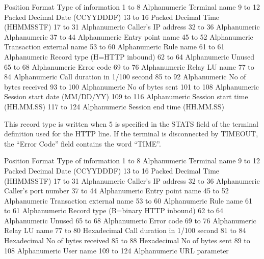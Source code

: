 \documentclass[letterpaper,10pt,english]{sphinxmanual}
\begin{document}
\begin{sphinxVerbatim}[commandchars=\\\{\}]
Position        Format          Type of information
1 to 8          Alphanumeric    Terminal name
9 to 12         Packed Decimal  Date (CCYYDDDF)
13 to 16        Packed Decimal  Time (HHMMSSTF)
17 to 31        Alphanumeric    Caller’s IP address
32 to 36        Alphanumeric    Alphanumeric
37 to 44        Alphanumeric    Entry point name
45 to 52        Alphanumeric    Transaction external name
53 to 60        Alphanumeric    Rule name
61 to 61        Alphanumeric    Record type (H=HTTP inbound)
62 to 64        Alphanumeric    Unused
65 to 68        Alphanumeric    Error code
69 to 76        Alphanumeric    Relay LU name
77 to 84        Alphanumeric    Call duration in 1/100 second
85 to 92        Alphanumeric    No of bytes received
93 to 100       Alphanumeric    No of bytes sent
101 to 108      Alphanumeric    Session start date (MM/DD/YY)
109 to 116      Alphanumeric    Session start time (HH.MM.SS)
117 to 124      Alphanumeric    Session end time (HH.MM.SS)
\end{sphinxVerbatim}


This record type is written when 5 is specified in the STATS field of the terminal definition used for the HTTP line. If the terminal is disconnected by TIMEOUT, the “Error Code” field contains the word     “TIME”.

\begin{sphinxVerbatim}[commandchars=\\\{\}]
Position        Format          Type of information
1 to 8          Alphanumeric    Terminal name
9 to 12         Packed Decimal  Date (CCYYDDDF)
13 to 16        Packed Decimal  Time (HHMMSSTF)
17 to 31        Alphanumeric    Caller’s IP address
32 to 36        Alphanumeric    Caller’s port number
37 to 44        Alphanumeric    Entry point name
45 to 52        Alphanumeric    Transaction external name
53 to 60        Alphanumeric    Rule name
61 to 61        Alphanumeric    Record type (B=binary HTTP inbound)
62 to 64        Alphanumeric    Unused
65 to 68        Alphanumeric    Error code
69 to 76        Alphanumeric    Relay LU name
77 to 80        Hexadecimal     Call duration in 1/100 second
81 to 84        Hexadecimal     No of bytes received
85 to 88        Hexadecimal     No of bytes sent
89 to 108       Alphanumeric    User name
109 to 124      Alphanumeric    URL parameter
\end{sphinxVerbatim}
\end{document}
